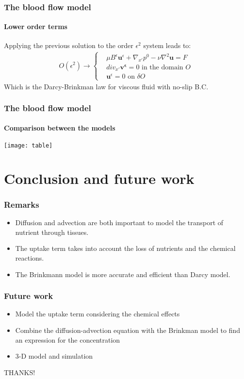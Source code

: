 \documentclass{beamer}
\begin{document}
\begin{frame}
\frametitle{The blood flow model}
\framesubtitle{Lower order terms}
Applying the previous solution to the order $\epsilon^2$ system leads to:
\begin{align*}
O(\epsilon^2)\to \begin{cases}
&\mu B^{\epsilon}\mathbf{u}^{\epsilon}+\nabla_{x'}p^0-\nu \nabla^2 \mathbf{u}=F\\
&div_{x'}\mathbf{v^{\epsilon}}=0 \text{ in the domain  }O\\
&\mathbf{u}^{\epsilon}=0 \text{ on } \delta O
\end{cases}
\end{align*}
Which is the Darcy-Brinkman law for viscous fluid \alert{with no-slip B.C}.
\end{frame}

\begin{frame}
\frametitle{The blood flow model}
\framesubtitle{Comparison between the models}
\flushleft
\texttt{[image: table]}
\end{frame}

\section{Conclusion and future work}
\begin{frame}
\frametitle{Remarks}
\begin{itemize}
\item Diffusion and advection are both important to model the transport of nutrient through tissues.\\
\item The uptake term takes into account the loss of nutrients and the chemical reactions.\\
\item The Brinkmann model is more accurate and efficient than Darcy model.\\
\end{itemize}
\end{frame}

\begin{frame}
\frametitle{Future work}
\begin{itemize}
\item Model the uptake term considering the chemical effects
\item Combine the diffusion-advection equation with the Brinkman model to find an expression for the concentration\\
\item 3-D model and simulation
\end{itemize}
\end{frame}
\begin{frame}
\centerline{THANKS!}

\end{frame}
\end{document}
